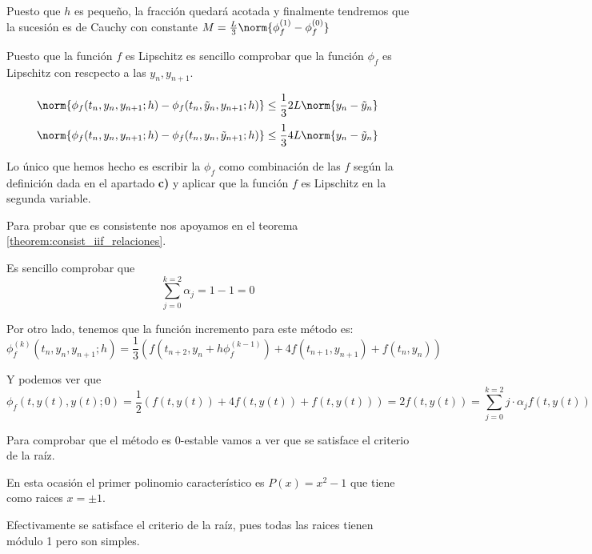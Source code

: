 \begin{problem}[4]
Puesto que $h$ es pequeño, la fracción quedará acotada y finalmente tendremos que la sucesión es de Cauchy con constante $M=\frac{L}{3}\norm{\phi_f^{(1)}-\phi_f^{(0)}}$

\spart
{}

Puesto que la función $f$ es Lipschitz es sencillo comprobar que la función $\phi_f$ es Lipschitz con rescpecto a las $y_n,y_{n+1}$.

\[\norm{\phi_f(t_n,y_n,y_{n+1};h)-\phi_f(t_n,\tilde{y}_n,y_{n+1};h)} \leq\frac{1}{3} 2L\norm{y_n-\tilde{y}_n}\]
\[\norm{\phi_f(t_n,y_n,y_{n+1};h)-\phi_f(t_n,y_n,\tilde{y}_{n+1};h)} \leq\frac{1}{3} 4L\norm{y_n-\tilde{y}_n}\]

Lo único que hemos hecho es escribir la $\phi_f$ como combinación de las $f$ según la definición dada en el apartado \textbf{c)} y aplicar que la función $f$ es Lipschitz en la segunda variable.

\spart


Para probar que es consistente nos apoyamos en el teorema \ref{theorem:consist_iif_relaciones}.

Es sencillo comprobar que
\[\sum_{j=0}^{k=2}α_j = 1-1 = 0\]

Por otro lado, tenemos que la función incremento para este método es:
\[\phi_f^{(k)}(t_n,y_n,y_{n+1};h) = \frac{1}{3}\left(f(t_{n+2},y_n+h\phi^{(k-1)}_f)+4f(t_{n+1},y_{n+1})+f(t_n,y_n) \right)\]

Y podemos ver que
\[\phi_f(t,y(t),y(t);0) = \frac{1}{2} \left(f(t,y(t))+4f(t,y(t))+f(t,y(t)) \right) = 2f(t,y(t)) = \sum_{j=0}^{k=2}j\cdot α_j f(t,y(t))\]

\spart

Para comprobar que el método es 0-estable vamos a ver que se satisface el criterio de la raíz.

En esta ocasión el primer polinomio característico es $P(x) = x^2-1$ que tiene como raices $x=\pm 1$.

Efectivamente se satisface el criterio de la raíz, pues todas las raices tienen módulo 1 pero son simples.


\end{problem}

